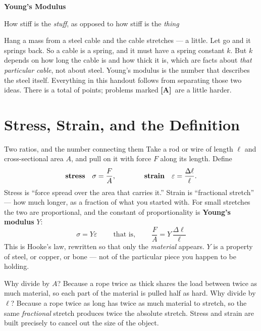 \documentclass[11pt]{article}
\newcommand{\totpts}{\setcounter{endpts}{\totvalue{tpts} + \totvalue{cpts}}\arabic{endpts}}
\newcommand{\ptfmt}[1]{\textbf{\color{ptred}#1\color{black}}}
\newcommand{\advanced}{\!\textbf{\color{advblue}[A]\color{black}}\ }
\theoremstyle{mystyle}
\newcommand{\psettitle}[1]{
    \begin{center}
    \huge \textbf{#1}
    \end{center}
}
\begin{document}
\psettitle{Young's Modulus}
\begin{center}
\large How stiff is the \emph{stuff}, as opposed to how stiff is the \emph{thing}
\end{center}

\noindent
Hang a mass from a steel cable and the cable stretches --- a little. Let go and it springs
back. So a cable is a spring, and it must have a spring constant $k$. But $k$ depends on
how long the cable is and how thick it is, which are facts about \emph{that particular
cable}, not about steel. Young's modulus is the number that describes the steel itself.
Everything in this handout follows from separating those two ideas. There is a total of
\ptfmt{\totpts} points; problems marked \advanced are a little harder.

\section{Stress, Strain, and the Definition}

\begin{psidea}{Two ratios, and the number connecting them}{}
Take a rod or wire of length $\ell$ and cross-sectional area $A$, and pull on it with
force $F$ along its length. Define
\[
\text{\textbf{stress}} \quad \sigma = \frac{F}{A},
\qquad\qquad
\text{\textbf{strain}} \quad \varepsilon = \frac{\Delta \ell}{\ell}.
\]
Stress is ``force spread over the area that carries it.'' Strain is ``fractional
stretch'' --- how much longer, as a fraction of what you started with. For small
stretches the two are proportional, and the constant of proportionality is
\textbf{Young's modulus} $Y$:
\[
\boxed{\;\sigma = Y \varepsilon \;}
\qquad\text{that is,}\qquad
\boxed{\;\frac{F}{A} = Y\,\frac{\Delta \ell}{\ell}\;}
\]
This is Hooke's law, rewritten so that only the \emph{material} appears. $Y$ is a property
of steel, or copper, or bone --- not of the particular piece you happen to be holding.
\end{psidea}

\begin{psremark*}{}{}
Why divide by $A$? Because a rope twice as thick shares the load between twice as much
material, so each part of the material is pulled half as hard. Why divide by $\ell$?
Because a rope twice as long has twice as much material to stretch, so the same
\emph{fractional} stretch produces twice the absolute stretch. Stress and strain are
built precisely to cancel out the size of the object.
\end{psremark*}
\end{document}
